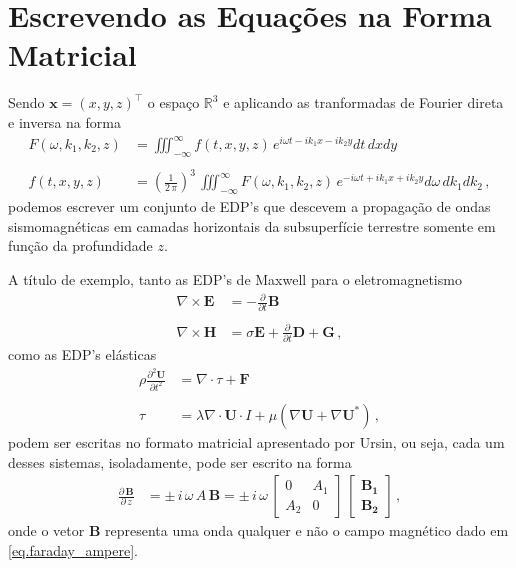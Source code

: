 \section{Escrevendo as Equa\c{c}\~oes na Forma Matricial}

Sendo $\mathbf{x}=(x,y,z)^{\top}$ o espa\c{c}o $\mathbb{R}^3$ e aplicando as tranformadas de Fourier direta e inversa na forma
\begin{align*}
F(\omega,k_1,k_2,z) &= \iiint_{-\infty}^{\infty}f(t,x,y,z)\,e^{i\omega t-ik_1x-ik_2y}dt\,dxdy\\\\
f(t,x,y,z) &= \left(\frac{1}{2\,\pi}\right)^3\,\iiint_{-\infty}^{\infty}F(\omega,k_1,k_2,z)\,e^{-i\omega t+ik_1x+ik_2y}d\omega\,dk_1dk_2\,,
\end{align*}
podemos escrever um conjunto de EDP's que descevem a propaga\c{c}\~ao de ondas sismomagn\'eticas em camadas horizontais da subsuperf\'icie terrestre somente em fun\c{c}\~ao da profundidade $z$. 

A t\'itulo de exemplo, tanto as EDP's de Maxwell para o eletromagnetismo
\begin{align}\label{eq.faraday_ampere}\nonumber
\nabla\times\mathbf{E}&=-\frac{\partial}{\partial t}\mathbf{B}\\\\\nonumber
\nabla\times\mathbf{H}&=\sigma\mathbf{E}+\frac{\partial}{\partial t}\mathbf{D}+\mathbf{G}\,,
\end{align}
como as EDP's el\'asticas
\begin{align}\label{eq.cauchy_hooke}\nonumber
\rho\frac{\partial^2 \mathbf{U}}{\partial t^2}&=\nabla\cdot\tau+\mathbf{F}\\\\\nonumber
\tau&=\lambda\nabla\cdot \mathbf{U}\cdot I + \mu(\nabla \mathbf{U}+\nabla \mathbf{U}^*)\,,
\end{align}
podem ser escritas no formato matricial apresentado por Ursin, ou seja, cada um desses sistemas, isoladamente, pode ser escrito na forma 
\begin{align}\label{eq.matricial}
\frac{\partial\,\mathbf{B}}{\partial\,z} &= \pm\,i\,\omega\,A\,\mathbf{B} = \pm\,i\,\omega\,
\begin{bmatrix}
0&A_1\\
A_2&0
\end{bmatrix}\,
\begin{bmatrix}
\mathbf{B_1}\\
\mathbf{B_2}	
\end{bmatrix}\,,
\end{align}
onde o vetor $\mathbf{B}$ representa uma onda qualquer e n\~ao o campo magn\'etico dado em \ref{eq.faraday_ampere}.

